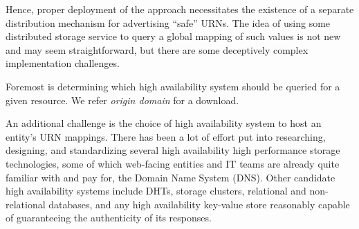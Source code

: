 Hence, proper deployment of the \SYSTEM{} approach necessitates the existence of
a separate distribution mechanism for advertising ``safe'' URNs. The idea of
using some distributed storage service to query a global mapping of such values
is not new and may seem straightforward, but there are some deceptively complex
implementation challenges.

Foremost is determining which high availability system should be queried for a
given resource. We refer \emph{origin domain} for a download. 

An additional challenge is the choice of high availability system to host an
entity's URN mappings. There has been a lot of effort put into researching,
designing, and standardizing several high availability high performance storage
technologies, some of which web-facing entities and IT teams are already quite
familiar with and pay for, \eg the Domain Name System (DNS). Other candidate
high availability systems include DHTs, storage clusters, relational and
non-relational databases, and any high availability key-value store reasonably
capable of guaranteeing the authenticity of its responses.
